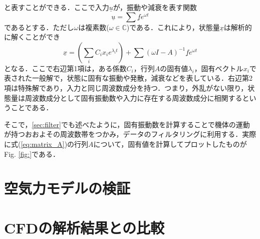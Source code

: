 と表すことができる．ここで入力$\underline{u}$が，振動や減衰を表す関数
\begin{equation}
  \underline{u} = \sum \underline{f} e^{\omega t}
\end{equation}
であるとする．ただし$\omega$は複素数($\omega \in \mathbb{C}$)である．これにより，状態量$\underline{x}$は解析的に解くことができ
\begin{equation}
  \underline{x} = \left(\sum_{i}C_i x_i e^{\lambda_i t}\right) +
  \sum(\omega I - A)^{-1} \underline{f} e^{\omega t}
\end{equation}
となる．ここで右辺第1項は，ある係数$C_i$，行列$A$の固有値$\lambda_i$，固有ベクトル$x_i$で表された一般解で，状態に固有な振動や発散，減衰などを表している．右辺第2項は特殊解であり，入力と同じ周波数成分を持つ．つまり，外乱がない限り，状態量は周波数成分として固有振動数や入力に存在する周波数成分に相関するということである．

そこで，\ref{sec:filter}でも述べたように，固有振動数を計算することで機体の運動が持つおおよその周波数帯をつかみ，データのフィルタリングに利用する．実際に式(\ref{eq:matrix_A})の行列$A$について，固有値を計算してプロットしたものがFig. \ref{fig:}である．

\section{空気力モデルの検証}

\section{CFDの解析結果との比較}
